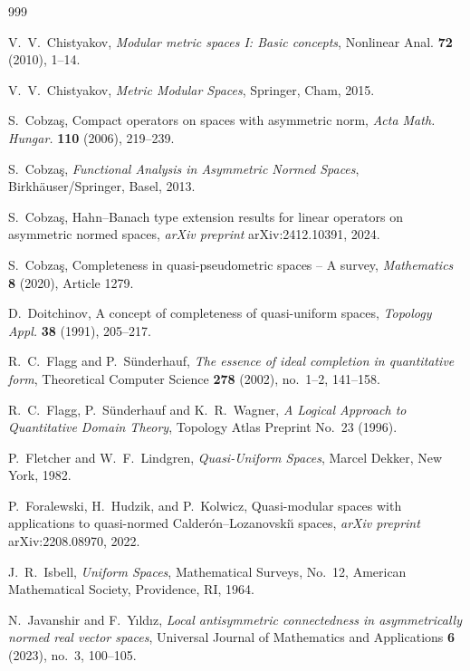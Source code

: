 \documentclass[preprint,12pt]{elsarticle}
\begin{document}
\begin{thebibliography}{999}

V.~V.~Chistyakov,
\emph{Modular metric spaces I: Basic concepts},
Nonlinear Anal. \textbf{72} (2010), 1--14.

V.~V.~Chistyakov,
\emph{Metric Modular Spaces},
Springer, Cham, 2015.

S.~Cobza\c{s},
Compact operators on spaces with asymmetric norm,
\emph{Acta Math. Hungar.} \textbf{110} (2006), 219--239.

S.~Cobza\c{s},
\emph{Functional Analysis in Asymmetric Normed Spaces},
Birkh\"auser/Springer, Basel, 2013.

S.~Cobza\c{s},
Hahn--Banach type extension results for linear operators on asymmetric normed spaces,
\emph{arXiv preprint} arXiv:2412.10391, 2024.

S.~Cobza\c{s},
Completeness in quasi-pseudometric spaces -- A survey,
\emph{Mathematics} \textbf{8} (2020), Article 1279.

D.~Doitchinov,
A concept of completeness of quasi-uniform spaces,
\emph{Topology Appl.} \textbf{38} (1991), 205--217.

R.~C.~Flagg and P.~S\"underhauf,
\emph{The essence of ideal completion in quantitative form},
Theoretical Computer Science \textbf{278} (2002), no.~1--2, 141--158.

R.~C.~Flagg, P.~S{\"u}nderhauf and K.~R.~Wagner,
\emph{A Logical Approach to Quantitative Domain Theory},
Topology Atlas Preprint No.~23 (1996).

P.~Fletcher and W.~F.~Lindgren,
\emph{Quasi-Uniform Spaces},
Marcel Dekker, New York, 1982.

P.~Foralewski, H.~Hudzik, and P.~Kolwicz,
Quasi-modular spaces with applications to quasi-normed
Calder\'on--Lozanovski\u{\i} spaces,
\emph{arXiv preprint} arXiv:2208.08970, 2022.

J.~R.~Isbell,
\emph{Uniform Spaces},
Mathematical Surveys, No.~12, American Mathematical Society, Providence, RI, 1964.

N.~Javanshir and F.~Yıldız,
\emph{Local antisymmetric connectedness in asymmetrically normed real vector spaces},
Universal Journal of Mathematics and Applications \textbf{6} (2023), no.~3, 100--105.


\end{thebibliography}
\end{document}
